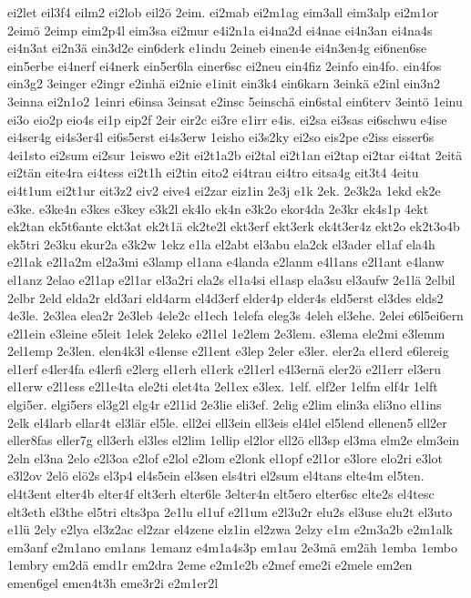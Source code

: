 {ei2let
eil3f4
eilm2
ei2lob
eil2ö
2eim.
ei2mab
ei2m1ag
eim3all
eim3alp
ei2m1or
2eimö
2eimp
eim2p4l
eim3sa
ei2mur
e4i2n1a
ei4na2d
ei4nae
ei4n3an
ei4na4s
ei4n3at
ei2n3ä
ein3d2e
ein6derk
e1indu
2eineb
einen4e
ei4n3en4g
ei6nen6se
ein5erbe
ei4nerf
ei4nerk
ein5er6la
einer6sc
ei2neu
ein4fiz
2einfo
ein4fo.
ein4fos
ein3g2
3einger
e2ingr
e2inhä
ei2nie
e1init
ein3k4
ein6karn
3einkä
e2inl
ein3n2
3einna
ei2n1o2
1einri
e6insa
3einsat
e2insc
5einschä
ein6stal
ein6terv
3eintö
1einu
ei3o
eio2p
eio4s
ei1p
eip2f
2eir
eir2c
ei3re
e1irr
e4is.
ei2sa
ei3sas
ei6schwu
e4ise
ei4ser4g
ei4s3er4l
ei6s5erst
ei4s3erw
1eisho
ei3s2ky
ei2so
eis2pe
e2iss
eisser6s
4ei1sto
ei2sum
ei2sur
1eiswo
e2it
ei2t1a2b
ei2tal
ei2t1an
ei2tap
ei2tar
ei4tat
2eitä
ei2tän
eite4ra
ei4tess
ei2t1h
ei2tin
eito2
ei4trau
ei4tro
eitsa4g
eit3t4
4eitu
ei4t1um
ei2t1ur
eit3z2
eiv2
eive4
ei2zar
eiz1in
2e3j
e1k
2ek.
2e3k2a
1ekd
ek2e
e3ke.
e3ke4n
e3kes
e3key
e3k2l
ek4lo
ek4n
e3k2o
ekor4da
2e3kr
ek4s1p
4ekt
ek2tan
ek5t6ante
ekt3at
ek2t1ä
ek2te2l
ekt3erf
ekt3erk
ek4t3er4z
ekt2o
ek2t3o4b
ek5tri
2e3ku
ekur2a
e3k2w
1ekz
e1la
el2abt
el3abu
ela2ck
el3ader
el1af
ela4h
e2l1ak
e2l1a2m
el2a3mi
e3lamp
el1ana
e4landa
e2lanm
e4l1ans
e2l1ant
e4lanw
el1anz
2elao
e2l1ap
e2l1ar
el3a2ri
ela2s
el1a4si
el1asp
ela3su
el3aufw
2e1lä
2elbil
2elbr
2eld
elda2r
eld3ari
eld4arm
el4d3erf
elder4p
elder4s
eld5erst
el3des
elds2
4e3le.
2e3lea
elea2r
2e3leb
4ele2c
el1ech
1elefa
eleg3s
4eleh
el3ehe.
2elei
e6l5ei6ern
e2l1ein
e3leine
e5leit
1elek
2eleko
e2l1el
1e2lem
2e3lem.
e3lema
ele2mi
e3lemm
2el1emp
2e3len.
elen4k3l
e4lense
e2l1ent
e3lep
2eler
e3ler.
eler2a
el1erd
e6lereig
el1erf
e4ler4fa
e4lerfi
e2lerg
el1erh
el1erk
e2l1erl
e4l3ernä
eler2ö
e2l1err
el3eru
el1erw
e2l1ess
e2l1e4ta
ele2ti
elet4ta
2el1ex
e3lex.
1elf.
elf2er
1elfm
elf4r
1elft
elgi5er.
elgi5ers
el3g2l
elg4r
e2l1id
2e3lie
eli3ef.
2elig
e2lim
elin3a
eli3no
el1ins
2elk
el4larb
ellar4t
el3lär
el5le.
ell2ei
ell3ein
ell3eis
el4lel
el5lend
ellenen5
ell2er
eller8fas
eller7g
ell3erh
el3les
el2lim
1ellip
el2lor
ell2ö
ell3sp
el3ma
elm2e
elm3ein
2eln
el3na
2elo
e2l3oa
e2lof
e2lol
e2lom
e2lonk
el1opf
e2l1or
e3lore
elo2ri
e3lot
e3l2ov
2elö
elö2s
el3p4
el4s5ein
el3sen
els4tri
el2sum
el4tans
elte4m
el5ten.
el4t3ent
elter4b
elter4f
elt3erh
elter6le
3elter4n
elt5ero
elter6sc
elte2s
el4tesc
elt3eth
el3the
el5tri
elts3pa
2e1lu
el1uf
e2l1um
e2l3u2r
elu2s
el3use
elu2t
el3uto
e1lü
2ely
e2lya
el3z2ac
el2zar
el4zene
elz1in
el2zwa
2elzy
e1m
e2m3a2b
e2m1alk
em3anf
e2m1ano
em1ans
1emanz
e4m1a4s3p
em1au
2e3mä
em2äh
1emba
1embo
1embry
em2dä
emd1r
em2dra
2eme
e2m1e2b
e2mef
eme2i
e2mele
em2en
emen6gel
emen4t3h
eme3r2i
e2m1er2l
}
